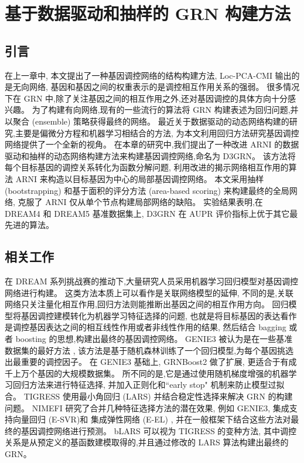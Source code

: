 \section{基于数据驱动和抽样的 GRN 构建方法}
\label{sec:d3grn}

\subsection{引言}

在上一章中, 本文提出了一种基因调控网络的结构构建方法,
Loc-PCA-CMI 输出的是无向网络, 基因和基因之间的权重表示的是调控相互作用关系的强弱。
很多情况下在 GRN 中,除了关注基因之间的相互作用之外,还对基因调控的具体方向十分感兴趣。
为了构建有向网络,现有的一些流行的算法将 GRN 构建表述为回归问题,并以聚合 (ensemble) 策略获得最终的网络。
最近关于数据驱动的动态网络构建的研究,主要是偏微分方程和机器学习相结合的方法, 
为本文利用回归方法研究基因调控网络提供了一个全新的视角。
在本章的研究中,我们提出了一种改进 ARNI 的数据驱动和抽样的动态网络构建方法来构建基因调控网络,命名为 D3GRN。
该方法将每个目标基因的调控关系转化为函数分解问题,
利用改进的揭示网络相互作用的算法 ARNI 来构造以目标基因为中心的局部基因调控网络。
本文采用抽样 (bootstrapping) 和基于面积的评分方法 (area-based scoring) 来构建最终的全局网络,
克服了 ARNI 仅从单个节点构建局部网络的缺陷。
实验结果表明,在 DREAM4 和 DREAM5 基准数据集上, D3GRN 在 AUPR 评价指标上优于其它最先进的算法。

\subsection{相关工作}

在 DREAM 系列挑战赛的推动下,大量研究人员采用机器学习回归模型对基因调控网络进行构建。
这类方法本质上可以看作是关联网络模型的延伸,
不同的是,关联网络只关注量化相互作用,回归方法则能推断出基因之间的相互作用方向。
回归模型将基因调控建模转化为机器学习特征选择的问题,
也就是将目标基因的表达看作是调控基因表达之间的相互线性作用或者非线性作用的结果,
然后结合 bagging 或者 boosting 的思想,构建出最终的基因调控网络。
GENIE3  被认为是在一些基准数据集的最好方法 ,
该方法是基于随机森林训练了一个回归模型,为每个基因挑选出最重要的调控因子。
在 GENIE3 基础上, GRNBoost2  做了扩展, 更适合于有成千上万个基因的大规模数据集。
所不同的是,它是通过使用随机梯度增强的机器学习回归方法来进行特征选择, 
并加入正则化和``early stop" 机制来防止模型过拟合。 
TIGRESS  使用最小角回归 (LARS) 并结合稳定性选择来解决 GRN 的构建问题。
NIMEFI  研究了合并几种特征选择方法的潜在效果,
例如 GENIE3, 集成支持向量回归 (E-SVR)和 集成弹性网络 (E-EL) ,
并在一般框架下结合这些方法对最终的基因调控网络进行预测。
bLARS  可以视为 TIGRESS 的变种方法,
其中调控关系是从预定义的基函数建模取得的,并且通过修改的 LARS 算法构建出最终的 GRN。

